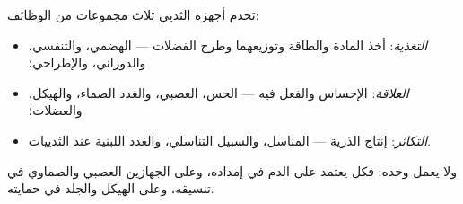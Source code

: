 \begin{proposition}\label{prop:b1:mammal-organization:functions}
تخدم أجهزة الثديي ثلاث مجموعات من الوظائف:
\begin{itemize}
  \item \emph{التغذية}: أخذ المادة والطاقة
        وتوزيعهما وطرح الفضلات ---  الهضمي، والتنفسي،
        والدوراني، والإطراحي؛
  \item \emph{العلاقة}: الإحساس  والفعل
        فيه ---  الحس،  العصبي، والغدد الصماء، والهيكل،
        والعضلات؛
  \item \emph{التكاثر}: إنتاج الذرية ---
        المناسل، والسبيل التناسلي، والغدد اللبنية عند الثدييات.
\end{itemize}
ولا يعمل  وحده: فكل  يعتمد على الدم في إمداده، وعلى الجهازين
العصبي والصماوي في تنسيقه، وعلى الهيكل والجلد في حمايته.
\end{proposition}

